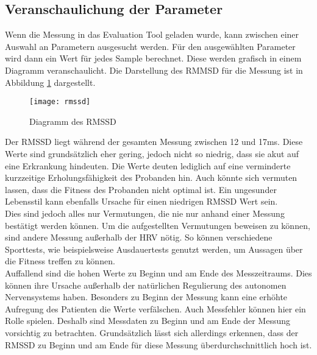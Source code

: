\subsection{Veranschaulichung der Parameter} \label{sec:anschaulich}
Wenn die Messung in das Evaluation Tool geladen wurde, kann zwischen einer Auswahl an Parametern ausgesucht werden. Für den ausgewählten Parameter wird dann ein Wert für jedes Sample berechnet. Diese werden grafisch in einem Diagramm veranschaulicht. Die Darstellung des RMMSD für die Messung ist in Abbildung \ref{fig:rmssd} dargestellt.
\begin{figure}[H]
	\centering
	\texttt{[image: rmssd]}
	\caption{Diagramm des RMSSD}
	\label{fig:rmssd}
\end{figure}
Der RMSSD liegt während der gesamten Messung zwischen 12 und 17ms. Diese Werte sind grundsätzlich eher gering, jedoch nicht so niedrig, dass sie akut auf eine Erkrankung hindeuten. Die Werte deuten lediglich auf eine verminderte kurzzeitige Erholungsfähigkeit des Probanden hin. Auch könnte sich vermuten lassen, dass die Fitness des Probanden nicht optimal ist. Ein ungesunder Lebensstil kann ebenfalls Ursache für einen niedrigen RMSSD Wert sein. \\
Dies sind jedoch alles nur Vermutungen, die nie nur anhand einer Messung bestätigt werden können. Um die aufgestellten Vermutungen beweisen zu können, sind andere Messung außerhalb der HRV nötig. So können verschiedene Sporttests, wie beispielsweise Ausdauertests genutzt werden, um Aussagen über die Fitness treffen zu können.\\
Auffallend sind die hohen Werte zu Beginn und am Ende des Messzeitraums. Dies können ihre Ursache außerhalb der natürlichen Regulierung des autonomen Nervensystems haben. Besonders zu Beginn der Messung kann eine erhöhte Aufregung des Patienten die Werte verfälschen. Auch Messfehler können hier ein Rolle spielen. Deshalb sind Messdaten zu Beginn und am Ende der Messung vorsichtig zu betrachten. Grundsätzlich lässt sich allerdings erkennen, dass der RMSSD zu Beginn und am Ende für diese Messung überdurchschnittlich hoch ist.


